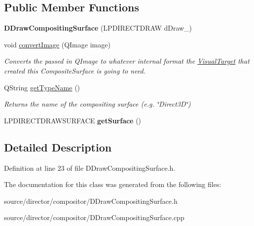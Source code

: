 \subsection*{Public Member Functions}
\begin{DoxyCompactItemize}
\item 
\hypertarget{class_picto_1_1_d_draw_compositing_surface_ab94cab1fc88be7d01b503569bf7f590e}{{\bfseries D\-Draw\-Compositing\-Surface} (L\-P\-D\-I\-R\-E\-C\-T\-D\-R\-A\-W d\-Draw\-\_\-)}\label{class_picto_1_1_d_draw_compositing_surface_ab94cab1fc88be7d01b503569bf7f590e}

\item 
\hypertarget{class_picto_1_1_d_draw_compositing_surface_a727e730ac32796205fe9c9ca8531816f}{void \hyperlink{class_picto_1_1_d_draw_compositing_surface_a727e730ac32796205fe9c9ca8531816f}{convert\-Image} (Q\-Image image)}\label{class_picto_1_1_d_draw_compositing_surface_a727e730ac32796205fe9c9ca8531816f}

\begin{DoxyCompactList}\small\item\em Converts the passed in Q\-Image to whatever internal format the \hyperlink{class_picto_1_1_visual_target}{Visual\-Target} that created this Composite\-Surface is going to need. \end{DoxyCompactList}\item 
\hypertarget{class_picto_1_1_d_draw_compositing_surface_a7823df81cd5f8132acd2ca271819fcc3}{Q\-String \hyperlink{class_picto_1_1_d_draw_compositing_surface_a7823df81cd5f8132acd2ca271819fcc3}{get\-Type\-Name} ()}\label{class_picto_1_1_d_draw_compositing_surface_a7823df81cd5f8132acd2ca271819fcc3}

\begin{DoxyCompactList}\small\item\em Returns the name of the compositing surface (e.\-g. \char`\"{}\-Direct3\-D\char`\"{}) \end{DoxyCompactList}\item 
\hypertarget{class_picto_1_1_d_draw_compositing_surface_a00a1a8be1eeb27ea59dc7e76c77e200f}{L\-P\-D\-I\-R\-E\-C\-T\-D\-R\-A\-W\-S\-U\-R\-F\-A\-C\-E {\bfseries get\-Surface} ()}\label{class_picto_1_1_d_draw_compositing_surface_a00a1a8be1eeb27ea59dc7e76c77e200f}

\end{DoxyCompactItemize}


\subsection{Detailed Description}


Definition at line 23 of file D\-Draw\-Compositing\-Surface.\-h.



The documentation for this class was generated from the following files\-:\begin{DoxyCompactItemize}
\item 
source/director/compositor/D\-Draw\-Compositing\-Surface.\-h\item 
source/director/compositor/D\-Draw\-Compositing\-Surface.\-cpp\end{DoxyCompactItemize}
